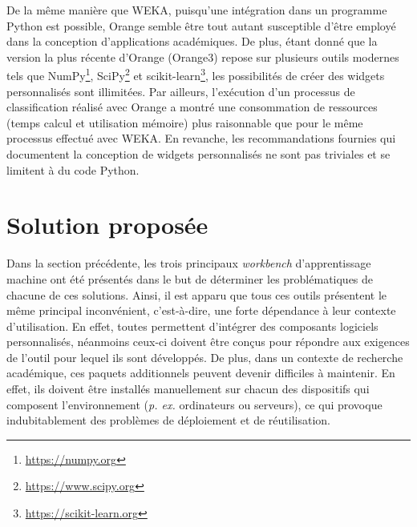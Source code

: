 De la même manière que WEKA, puisqu'une intégration dans un programme Python est possible, Orange semble être tout autant susceptible d'être employé dans la conception d'applications académiques. De plus, étant donné que la version la plus récente d'Orange (Orange3) repose sur plusieurs outils modernes tels que NumPy\footnote{\url{https://numpy.org}}, SciPy\footnote{\url{https://www.scipy.org}} et scikit-learn\footnote{\url{https://scikit-learn.org}}, les possibilités de créer des widgets personnalisés sont illimitées. Par ailleurs, l'exécution d'un processus de classification réalisé avec Orange a montré une consommation de ressources (temps calcul et utilisation mémoire) plus raisonnable que pour le même processus effectué avec \acs{WEKA}. En revanche, les recommandations fournies qui documentent la conception de widgets personnalisés ne sont pas triviales et se limitent à du code Python.

\section{Solution proposée}

Dans la section précédente, les trois principaux \textit{workbench} d'apprentissage machine ont été présentés dans le but de déterminer les problématiques de chacune de ces solutions. Ainsi, il est apparu que tous ces outils présentent le même principal inconvénient, c'est-à-dire, une forte dépendance à leur contexte d'utilisation. En effet, toutes permettent d'intégrer des composants logiciels personnalisés, néanmoins ceux-ci doivent être conçus pour répondre aux exigences de l'outil pour lequel ils sont développés. De plus, dans un contexte de recherche académique, ces paquets additionnels peuvent devenir difficiles à maintenir. En effet, ils doivent être installés manuellement sur chacun des dispositifs qui composent l'environnement (\textit{p. ex.} ordinateurs ou serveurs), ce qui provoque indubitablement des problèmes de déploiement et de réutilisation.

